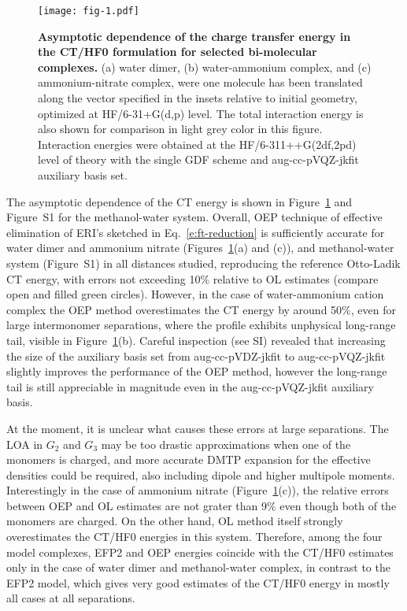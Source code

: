 \documentclass[aip,jcp,amsmath,amssymb,reprint,floatfix]{revtex4-1}
\begin{document}
%
\begin{figure}[h]
\texttt{[image: fig-1.pdf]}
\caption{\label{f:fig-1} {\bf Asymptotic dependence of the charge transfer energy
in the CT/HF0 formulation for selected bi\hyp{}molecular complexes.} 
(a) water dimer, 
(b) water\hyp{}ammonium complex, and 
(c) ammonium\hyp{}nitrate complex,
were one molecule has been translated
along the vector specified in the insets relative to initial geometry,
optimized at HF/6-31+G(d,p) level.
The 
total interaction energy
is also shown for comparison in light grey color in this figure.
Interaction energies were obtained at the HF/6-311++G(2df,2pd) level of theory
with the single GDF scheme and aug-cc-pVQZ-jkfit auxiliary basis set.
} 
\end{figure}
%
The asymptotic dependence of the CT energy
is
shown in Figure~\ref{f:fig-1} and Figure~S1 for the methanol\hyp{}water system. 
Overall, OEP technique of effective
elimination of ERI's sketched in Eq.~\eqref{e:ft-reduction} 
is sufficiently accurate
for water dimer and ammonium nitrate (Figures~\ref{f:fig-1}(a) and (c)),
and methanol\hyp{}water system (Figure~S1) in all distances studied,
reproducing the reference Otto\hyp{}Ladik CT energy, with errors not
exceeding 10\% relative to OL estimates (compare open and filled green circles).
However, in the case of water\hyp{}ammonium cation complex the OEP
method overestimates the CT energy by around 50\%, even for large
intermonomer separations, where the profile exhibits
unphysical long\hyp{}range tail, visible in Figure~\ref{f:fig-1}(b). 
Careful inspection
(see SI)
revealed that increasing the size of the 
auxiliary basis set from aug-cc-pVDZ-jkfit to aug-cc-pVQZ-jkfit
slightly improves the performance of the OEP method, however the long\hyp{}range
tail is still appreciable in magnitude even in the aug-cc-pVQZ-jkfit auxiliary basis.

At the moment, it is unclear what causes these errors at large separations. 
The LOA in $G_2$ and $G_3$ may be too drastic approximations
when one of the monomers is charged, and more accurate
DMTP expansion for the effective densities could be required,
also including dipole and higher multipole moments. %
Interestingly in the case of ammonium nitrate (Figure~\ref{f:fig-1}(c)),
the relative errors between OEP and OL estimates
are not grater than 9\% even though both of the monomers are charged.
On the other hand, OL method itself strongly overestimates the CT/HF0
energies in this system. Therefore, among the four
model complexes, EFP2 and OEP energies
coincide with the CT/HF0 estimates 
only in the case of water dimer and methanol-water complex,
in contrast to the EFP2 model, which gives very good estimates
of the CT/HF0 energy in mostly all cases at all separations.
\end{document}
